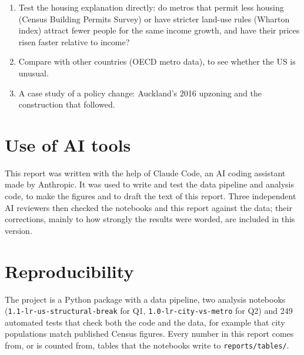 \documentclass[11pt]{article}
\begin{document}
\begin{enumerate}
  \item Test the housing explanation directly: do metros that permit less housing (Census Building
        Permits Survey) or have stricter land-use rules (Wharton index) attract fewer people for the
        same income growth, and have their prices risen faster relative to income?
  \item Compare with other countries (OECD metro data), to see whether the US is unusual.
  \item A case study of a policy change: Auckland's 2016 upzoning and the construction that
        followed.
\end{enumerate}

\section*{Use of AI tools}
This report was written with the help of Claude Code, an AI coding assistant made by Anthropic.
It was used to write and test the data pipeline and analysis code, to make the figures and to
draft the text of this report. Three independent AI reviewers then checked the notebooks and this
report against the data; their corrections, mainly to how strongly the results were worded, are
included in this version.

\section*{Reproducibility}
The project is a Python package with a data pipeline, two analysis notebooks
(\nolinkurl{1.1-lr-us-structural-break} for Q1, \nolinkurl{1.0-lr-city-vs-metro} for Q2) and 249
automated tests that check both the code and the data, for example that city populations match
published Census figures. Every number in this report comes from, or is counted from, tables that
the notebooks write to \texttt{reports/tables/}.
\end{document}
